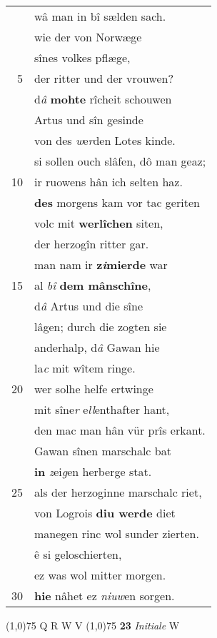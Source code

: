 \documentclass[8pt,a4paper,notitlepage]{article}
\begin{document}
\begin{table}[ht]
\begin{minipage}[t]{0.5\linewidth}
\begin{tabular}{rl}
 & wâ man in bî sælden sach.\\ 
 & wie der von Norwæge\\ 
 & sînes volkes pflæge,\\ 
5 & der ritter und der vrouwen?\\ 
 & d\textit{â} \textbf{mohte} rîcheit schouwen\\ 
 & Artus und sîn gesinde\\ 
 & von des \textit{w}e\textit{r}den Lotes kinde.\\ 
 & si sollen ouch slâfen, dô man geaz;\\ 
10 & ir ruowens hân ich selten haz.\\ 
 & \textbf{des} morgens kam vor tac geriten\\ 
 & volc mit \textbf{werlîchen} siten,\\ 
 & der herzogîn ritter gar.\\ 
 & man nam ir \textbf{z\textit{i}mierde} war\\ 
15 & al \textit{bî} \textbf{dem mânschîne},\\ 
 & d\textit{â} Artus und die sîne\\ 
 & lâgen; durch die zogten sie\\ 
 & anderhalp, d\textit{â} Gawan hie\\ 
 & la\textit{c} mit wîtem ringe.\\ 
20 & wer solhe helfe ertwinge\\ 
 & mit sîne\textit{r} e\textit{ll}enthafter hant,\\ 
 & den mac man hân vür prîs erkant.\\ 
 & Gawan sînen marschalc bat\\ 
 & \textbf{in} \textit{z}ei\textit{g}en herberge stat.\\ 
25 & als der herzoginne marschalc riet,\\ 
 & von Logrois \textbf{diu werde} diet\\ 
 & manegen rinc wol sunder zierten.\\ 
 & ê si geloschierten,\\ 
 & ez was wol mitter morgen.\\ 
30 & \textbf{hie} nâhet ez \textit{niuw}en sorgen.\\ 
\end{tabular}
\scriptsize
\line(1,0){75} \newline
Q R W V \newline
\line(1,0){75} \newline
\textbf{23} \textit{Initiale} W  \newline

\end{minipage}
\end{table}
\end{document}
